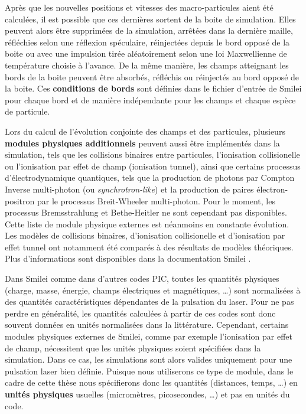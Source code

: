 \begin{refsection}

Après que les nouvelles positions et vitesses des macro-particules aient été calculées, il est possible que ces dernières sortent de la boite de simulation. Elles peuvent alors être supprimées de la simulation, arrêtées dans la dernière maille, réfléchies selon une réflexion spéculaire, réinjectées depuis le bord opposé de la boite ou avec une impulsion tirée aléatoirement selon une loi Maxwellienne de température choisie à l'avance. 
De la même manière, les champs atteignant les bords de la boite peuvent être absorbés, réfléchis ou réinjectés au bord opposé de la boite.
Ces \textbf{conditions de bords} sont définies dans le fichier d'entrée de Smilei pour chaque bord et de manière indépendante pour les champs et chaque espèce de particule. 

Lors du calcul de l'évolution conjointe des champs et des particules, plusieurs \textbf{modules physiques additionnels} peuvent aussi être implémentés dans la simulation, tels que les collisions binaires entre particules, l'ionisation collisionelle ou l'ionisation par effet de champ (ionisation tunnel), ainsi que certains processus d'électrodynamique quantiques, tels que la production de photons par Compton Inverse multi-photon (ou \textit{synchrotron-like}) et la production de paires électron-positron par le processus Breit-Wheeler multi-photon. Pour le moment, les processus Bremsstrahlung et Bethe-Heitler ne sont cependant pas disponibles. Cette liste de module physique externes est néanmoins en constante évolution.
Les modèles de collisions binaires, d'ionisation collisionelle et d'ionisation par effet tunnel ont notamment été comparés à des résultats de modèles théoriques. Plus d'informations sont disponibles dans la documentation Smilei \parencite{derouillat_2018}.

Dans Smilei comme dans d'autres codes PIC, toutes les quantités physiques (charge, masse, énergie, champs électriques et magnétiques, …) sont normalisées à des quantités caractéristiques dépendantes de la pulsation du laser. Pour ne pas perdre en généralité, les quantités calculées à partir de ces codes sont donc souvent données en unités normalisées dans la littérature. Cependant, certains modules physiques externes de Smilei, comme par exemple l'ionisation par effet de champ, nécessitent que les unités physiques soient spécifiées dans la simulation. Dans ce cas, les simulations sont alors valides uniquement pour une pulsation laser bien définie. Puisque nous utiliserons ce type de module, dans le cadre de cette thèse nous spécifierons donc les quantités (distances, temps, …) en \textbf{unités physiques} usuelles (micromètres, picosecondes, …) et pas en unités du code.


\end{refsection}
